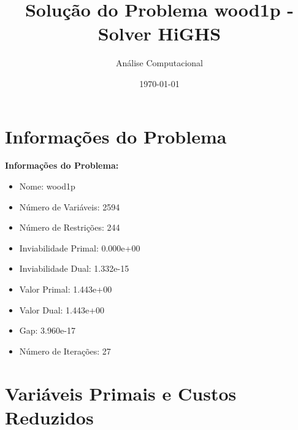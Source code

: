 \documentclass[12pt]{article}
\title{Solução do Problema wood1p - Solver HiGHS}
\author{Análise Computacional}
\date{\today}
\begin{document}
\maketitle

\section{Informações do Problema}

\textbf{Informações do Problema:}
\begin{itemize}
\item Nome: wood1p
\item Número de Variáveis: 2594
\item Número de Restrições: 244
\item Inviabilidade Primal: 0.000e+00
\item Inviabilidade Dual: 1.332e-15
\item Valor Primal: 1.443e+00
\item Valor Dual: 1.443e+00
\item Gap: 3.960e-17
\item Número de Iterações: 27
\end{itemize}


\section{Variáveis Primais e Custos Reduzidos}
\end{document}
